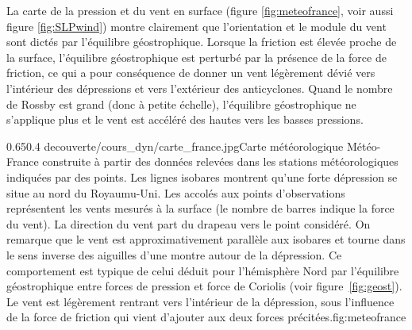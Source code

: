 \sk
La carte de la pression et du vent en surface (figure \ref{fig:meteofrance}, voir aussi figure \ref{fig:SLPwind}) montre clairement que l'orientation et le module du vent sont dictés par l'équilibre géostrophique. Lorsque la friction est élevée proche de la surface, l'équilibre géostrophique est perturbé par la présence de la force de friction, ce qui a pour conséquence de donner un vent légèrement dévié vers l'intérieur des dépressions et vers l'extérieur des anticyclones. Quand le nombre de Rossby est grand (donc à petite échelle), l'équilibre géostrophique ne s'applique plus et le vent est accéléré des hautes vers les basses pressions. 

\figside
{0.65}{0.4}
{decouverte/cours_dyn/carte_france.jpg}{Carte météorologique Météo-France construite à partir des données relevées dans les stations météorologiques indiquées par des points. Les lignes isobares montrent qu'une forte dépression se situe au nord du Royaumu-Uni. Les  accolés aux points d'observations représentent les vents mesurés à la surface (le nombre de barres indique la force du vent). La direction du vent part du drapeau vers le point considéré. On remarque que le vent est approximativement parallèle aux isobares et tourne dans le sens inverse des aiguilles d'une montre autour de la dépression. Ce comportement est typique de celui déduit pour l'hémisphère Nord par l'équilibre géostrophique entre forces de pression et force de Coriolis (voir figure~\ref{fig:geost}). Le vent est légèrement rentrant vers l'intérieur de la dépression, sous l'influence de la force de friction qui vient d'ajouter aux deux forces précitées.}{fig:meteofrance}
